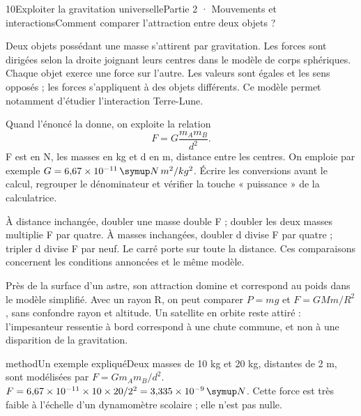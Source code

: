 \begin{ouverture}[college2]{10}{Exploiter la gravitation universelle}{Partie 2 · Mouvements et interactions}{Comment comparer l’attraction entre deux objets ?}
\end{ouverture}
\label{ess-10}
Deux objets possédant une masse s’attirent par gravitation. Les forces sont dirigées selon la droite joignant leurs centres dans le modèle de corps sphériques. Chaque objet exerce une force sur l’autre. Les valeurs sont égales et les sens opposés ; les forces s’appliquent à des objets différents. Ce modèle permet notamment d’étudier l’interaction Terre-Lune.\par
{}
Quand l’énoncé la donne, on exploite la relation \[F=G\dfrac{m_A m_B}{d^2}.\] F est en N, les masses en kg et d en m, distance entre les centres. On emploie par exemple $G=6{,}67\times10^{-11}\unite{N\,m^2/kg^2}$. Écrire les conversions avant le calcul, regrouper le dénominateur et vérifier la touche « puissance » de la calculatrice.\par
\clearpage
{}
À distance inchangée, doubler une masse double F ; doubler les deux masses multiplie F par quatre. À masses inchangées, doubler d divise F par quatre ; tripler d divise F par neuf. Le carré porte sur toute la distance. Ces comparaisons concernent les conditions annoncées et le même modèle.\par
{}
Près de la surface d’un astre, son attraction domine et correspond au poids dans le modèle simplifié. Avec un rayon R, on peut comparer $P=mg$ et $F=GMm/R^2$, sans confondre rayon et altitude. Un satellite en orbite reste attiré : l’impesanteur ressentie à bord correspond à une chute commune, et non à une disparition de la gravitation.\par
\begin{pcEncadre}{method}{Un exemple expliqué}Deux masses de 10 kg et 20 kg, distantes de 2 m, sont modélisées par $F=Gm_Am_B/d^2$. $F=6{,}67\times10^{-11}\times10\times20/2^2=3{,}335\times10^{-9}\unite N$. Cette force est très faible à l’échelle d’un dynamomètre scolaire ; elle n’est pas nulle.\end{pcEncadre}
